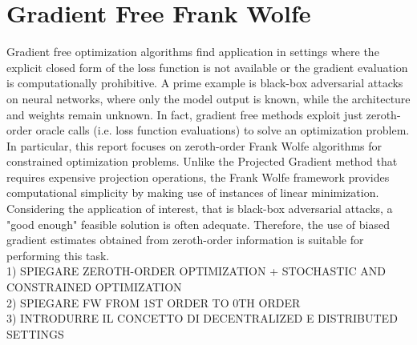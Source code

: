 \section{Gradient Free Frank Wolfe}
Gradient free optimization algorithms find application in settings where the explicit closed form of the loss function is not available or the gradient evaluation is computationally prohibitive. A prime example is black-box adversarial attacks on neural networks, where only the model output is known, while the architecture and weights remain unknown. In fact, gradient free methods exploit just zeroth-order oracle calls (i.e. loss function evaluations) to solve an optimization problem.\\
In particular, this report focuses on zeroth-order Frank Wolfe algorithms for constrained optimization problems. Unlike the Projected Gradient method that requires expensive projection operations, the Frank Wolfe framework provides computational simplicity by making use of instances of linear minimization. \\
Considering the application of interest, that is black-box adversarial attacks, a "good enough" feasible solution is often adequate. Therefore, the use of biased gradient estimates obtained from zeroth-order information is suitable for performing this task.\\

1) SPIEGARE ZEROTH-ORDER OPTIMIZATION + STOCHASTIC AND CONSTRAINED OPTIMIZATION\\
2) SPIEGARE FW FROM 1ST ORDER TO 0TH ORDER\\
3) INTRODURRE IL CONCETTO DI DECENTRALIZED E DISTRIBUTED SETTINGS\\

